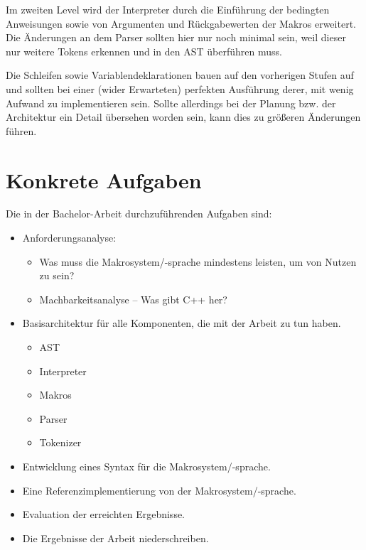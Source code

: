     Im zweiten Level wird der Interpreter durch die Einführung der bedingten Anweisungen sowie von Argumenten und Rückgabewerten der Makros erweitert. Die Änderungen an dem Parser sollten hier nur noch minimal sein, weil dieser nur weitere Tokens erkennen und in den AST überführen muss.

    Die Schleifen sowie Variablendeklarationen bauen auf den vorherigen Stufen auf und sollten bei einer (wider Erwarteten) perfekten Ausführung derer, mit wenig Aufwand zu implementieren sein. Sollte allerdings bei der Planung bzw. der Architektur ein Detail übersehen worden sein, kann dies zu größeren Änderungen führen.

\section{Konkrete Aufgaben}
\label{sec:konkrete_aufgaben}
  Die in der Bachelor-Arbeit durchzuführenden Aufgaben sind:
  \begin{itemize}
    \item Anforderungsanalyse:
      \begin{itemize}
        \item Was muss die Makrosystem/-sprache mindestens leisten, um von Nutzen zu sein?
        \item Machbarkeitsanalyse -- Was gibt C++ her?
      \end{itemize}
    \item Basisarchitektur für alle Komponenten, die mit der Arbeit zu tun haben.
      \begin{itemize}
        \item AST
        \item Interpreter
        \item Makros
        \item Parser
        \item Tokenizer
      \end{itemize}
    \item Entwicklung eines Syntax für die Makrosystem/-sprache.
    \item Eine Referenzimplementierung von der Makrosystem/-sprache.
    \item Evaluation der erreichten Ergebnisse.
    \item Die Ergebnisse der Arbeit niederschreiben.
  \end{itemize}

